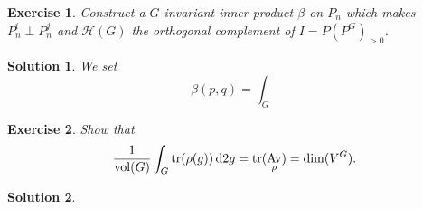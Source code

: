 \documentclass{article}
\newtheorem{ex}{Exercise}
\theoremstyle{nonumberplain}
\newtheorem{sol}{Solution}
\DeclareMathOperator{\vol}{vol}
\DeclareMathOperator{\Av}{Av}
\DeclareMathOperator{\trace}{tr}
\newcommand{\HH}{\mathcal{H}}
\begin{document}
\begin{ex}
Construct a $G$-invariant inner product $\beta$ on $P_n$ which makes $P^i_n \perp P^j_n$ and $\HH(G)$ the orthogonal complement of $I = P (P^G)_{>0}$.
\end{ex}

\begin{sol}
We set
\begin{equation}
\beta(p,q) = \int_G 
\end{equation}
\end{sol}

\begin{ex}
Show that
\begin{equation}
\frac1{\vol(G)} \int_G \trace(\rho(g)) \dl2 g = \trace(\Av_\rho) = \dim(V^G).
\end{equation}
\end{ex}

\begin{sol}

\end{sol}
\end{document}
